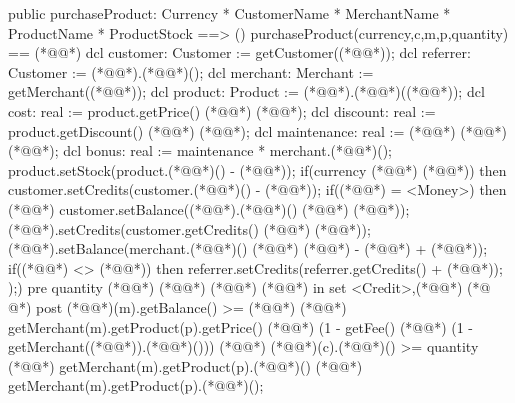 \begin{vdmpp}[breaklines=true]
 public purchaseProduct: Currency * CustomerName * MerchantName * ProductName * ProductStock ==> ()
 purchaseProduct(currency,c,m,p,quantity) == (*@\vdmnotcovered{(}@*)
  dcl customer: Customer := getCustomer((*@@*));
  dcl referrer: Customer := (*@@*).(*@@*)();
  dcl merchant: Merchant := getMerchant((*@@*));
  dcl product: Product := (*@@*).(*@@*)((*@@*));
  dcl cost: real := product.getPrice() (*@\vdmnotcovered{*}@*) (*@@*);
  dcl discount: real := product.getDiscount() (*@\vdmnotcovered{*}@*) (*@@*);
  dcl maintenance: real := (*@@*) (*@\vdmnotcovered{*}@*) (*@@*);
  dcl bonus: real := maintenance * merchant.(*@@*)();
  product.setStock(product.(*@@*)() - (*@@*));
  if(currency (*@\vdmnotcovered{=}@*) (*@@*)) then
   customer.setCredits(customer.(*@@*)() - (*@@*)); 
  if((*@@*) = <Money>) then (*@\vdmnotcovered{(}@*)
   customer.setBalance((*@@*).(*@@*)() (*@\vdmnotcovered{-}@*) (*@@*));
   (*@@*).setCredits(customer.getCredits() (*@\vdmnotcovered{+}@*) (*@@*));
   (*@@*).setBalance(merchant.(*@@*)() (*@\vdmnotcovered{+}@*) (*@@*) - (*@@*) + (*@@*));
   if((*@@*) <> (*@@*))
   then referrer.setCredits(referrer.getCredits() + (*@@*));
  );)
  pre quantity (*@\vdmnotcovered{>}@*) (*@@*) (*@@*) (*@@*) in set {<Credit>,(*@@*)}
(*@
\label{transferCredit:81}
@*)
  post (*@@*)(m).getBalance() >= (*@@*) (*@\vdmnotcovered{*}@*)
  getMerchant(m).getProduct(p).getPrice() (*@\vdmnotcovered{*}@*)
  (1 - getFee() (*@\vdmnotcovered{*}@*) (1 - getMerchant((*@@*)).(*@@*)()))
  (*@@*) (*@@*)(c).(*@@*)() >= quantity (*@\vdmnotcovered{*}@*)
  getMerchant(m).getProduct(p).(*@@*)() (*@\vdmnotcovered{*}@*)
  getMerchant(m).getProduct(p).(*@@*)();
 

\end{vdmpp}
